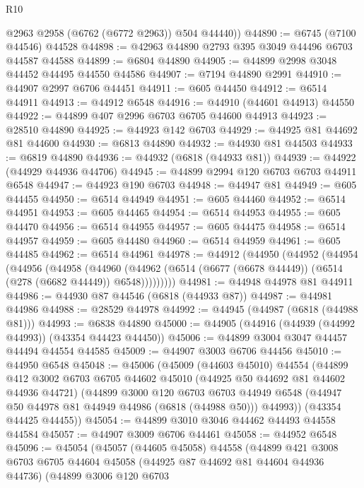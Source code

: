 \begin{lexlean}{R10}
\begin{coremodule}
        @2963
        @2958
        (@6762 (@6772 @2963))
        @504
        @44440))
@44890 := @6745 (@7100 @44546) @44528
@44898 := @42963 @44890 @2793 @395 @3049 @44496 @6703 @44587 @44588
@44899 := @6804 @44890
@44905 := @44899 @2998 @3048 @44452 @44495 @44550 @44586
@44907 := @7194 @44890 @2991
@44910 := @44907 @2997 @6706 @44451
@44911 := @605 @44450
@44912 := @6514 @44911
@44913 := @44912 @6548
@44916 := @44910 (@44601 @44913) @44550
@44922 := @44899 @407 @2996 @6703 @6705 @44600 @44913
@44923 := @28510 @44890
@44925 := @44923 @142 @6703
@44929 := @44925 @81 @44692 @81 @44600
@44930 := @6813 @44890
@44932 := @44930 @81 @44503
@44933 := @6819 @44890
@44936 := @44932 (@6818 (@44933 @81))
@44939 := @44922 (@44929 @44936 @44706)
@44945 := @44899 @2994 @120 @6703 @6703 @44911 @6548
@44947 := @44923 @190 @6703
@44948 := @44947 @81
@44949 := @605 @44455
@44950 := @6514 @44949
@44951 := @605 @44460
@44952 := @6514 @44951
@44953 := @605 @44465
@44954 := @6514 @44953
@44955 := @605 @44470
@44956 := @6514 @44955
@44957 := @605 @44475
@44958 := @6514 @44957
@44959 := @605 @44480
@44960 := @6514 @44959
@44961 := @605 @44485
@44962 := @6514 @44961
@44978 := @44912
    (@44950
      (@44952
        (@44954
          (@44956
            (@44958
              (@44960
                (@44962 (@6514 (@6677 (@6678 @44449)) (@6514 (@278 (@6682 @44449)) @6548)))))))))
@44981 := @44948 @44978 @81 @44911
@44986 := @44930 @87 @44546 (@6818 (@44933 @87))
@44987 := @44981 @44986
@44988 := @28529 @44978
@44992 := @44945 (@44987 (@6818 (@44988 @81)))
@44993 := @6838 @44890
@45000 := @44905 (@44916 (@44939 (@44992 @44993)) (@43354 @44423 @44450))
@45006 := @44899 @3004 @3047 @44457 @44494 @44554 @44585
@45009 := @44907 @3003 @6706 @44456
@45010 := @44950 @6548
@45048 := @45006
    (@45009
      (@44603 @45010)
      @44554
      (@44899
        @412
        @3002
        @6703
        @6705
        @44602
        @45010
        (@44925 @50 @44692 @81 @44602 @44936 @44721)
        (@44899
          @3000
          @120
          @6703
          @6703
          @44949
          @6548
          (@44947 @50 @44978 @81 @44949 @44986 (@6818 (@44988 @50)))
          @44993))
      (@43354 @44425 @44455))
@45054 := @44899 @3010 @3046 @44462 @44493 @44558 @44584
@45057 := @44907 @3009 @6706 @44461
@45058 := @44952 @6548
@45096 := @45054
    (@45057
      (@44605 @45058)
      @44558
      (@44899
        @421
        @3008
        @6703
        @6705
        @44604
        @45058
        (@44925 @87 @44692 @81 @44604 @44936 @44736)
        (@44899
          @3006
          @120
          @6703

\end{coremodule}
\end{lexlean}

